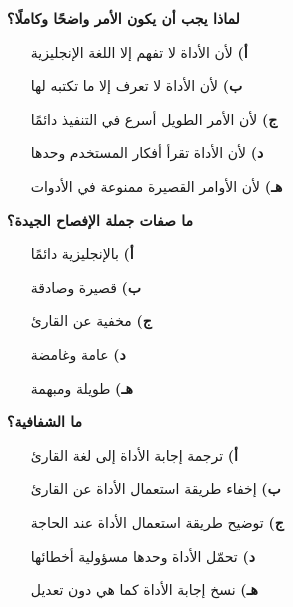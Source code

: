 \documentclass[11pt,a4paper]{article}
\begin{document}
\begin{multicols}{2}
\noindent\begin{minipage}{\linewidth}
\hangindent=0.7cm\textbf{لماذا يجب أن يكون الأمر واضحًا وكاملًا؟}
\begin{itemize}[leftmargin=0.95cm, labelsep=4pt, itemsep=0pt, topsep=2pt, parsep=0pt]
  \item[\textbf{أ)}] لأن الأداة لا تفهم إلا اللغة الإنجليزية
  \item[\textbf{ب)}] لأن الأداة لا تعرف إلا ما تكتبه لها
  \item[\textbf{ج)}] لأن الأمر الطويل أسرع في التنفيذ دائمًا
  \item[\textbf{د)}] لأن الأداة تقرأ أفكار المستخدم وحدها
  \item[\textbf{هـ)}] لأن الأوامر القصيرة ممنوعة في الأدوات
\end{itemize}
\end{minipage}\par\vspace{7pt plus 4pt}
\noindent\begin{minipage}{\linewidth}
\hangindent=0.7cm\textbf{ما صفات جملة الإفصاح الجيدة؟}
\begin{itemize}[leftmargin=0.95cm, labelsep=4pt, itemsep=0pt, topsep=2pt, parsep=0pt]
  \item[\textbf{أ)}] بالإنجليزية دائمًا
  \item[\textbf{ب)}] قصيرة وصادقة
  \item[\textbf{ج)}] مخفية عن القارئ
  \item[\textbf{د)}] عامة وغامضة
  \item[\textbf{هـ)}] طويلة ومبهمة
\end{itemize}
\end{minipage}\par\vspace{7pt plus 4pt}
\noindent\begin{minipage}{\linewidth}
\hangindent=0.7cm\textbf{ما الشفافية؟}
\begin{itemize}[leftmargin=0.95cm, labelsep=4pt, itemsep=0pt, topsep=2pt, parsep=0pt]
  \item[\textbf{أ)}] ترجمة إجابة الأداة إلى لغة القارئ
  \item[\textbf{ب)}] إخفاء طريقة استعمال الأداة عن القارئ
  \item[\textbf{ج)}] توضيح طريقة استعمال الأداة عند الحاجة
  \item[\textbf{د)}] تحمّل الأداة وحدها مسؤولية أخطائها
  \item[\textbf{هـ)}] نسخ إجابة الأداة كما هي دون تعديل

\end{itemize}
\end{minipage}
\end{multicols}
\end{document}
